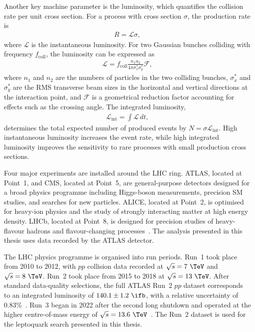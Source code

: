 Another key machine parameter is the luminosity, which quantifies the collision rate per unit cross section.
For a process with cross section $\sigma$, the production rate is
\begin{align}
    R = \mathcal{L}\sigma,
    \label{eq:lhc_event_rate}
\end{align}
where $\mathcal{L}$ is the instantaneous luminosity.
For two Gaussian bunches colliding with frequency $f_{\mathrm{coll}}$, the luminosity can be expressed as~\cite{Herr2006Luminosity}
\begin{align}
    \mathcal{L}
    =
    f_{\mathrm{coll}}
    \frac{n_{1}n_{2}}
    {4\pi\sigma^{*}_{x}\sigma^{*}_{y}}
    \mathcal{F},
    \label{eq:lhc_luminosity_formula}
\end{align}
where $n_{1}$ and $n_{2}$ are the numbers of particles in the two colliding bunches, $\sigma^{*}_{x}$ and $\sigma^{*}_{y}$ are the RMS transverse beam sizes in the horizontal and vertical directions at the interaction point, and $\mathcal{F}$ is a geometrical reduction factor accounting for effects such as the crossing angle.
The integrated luminosity,
\begin{align}
    \mathcal{L}_{\mathrm{int}}
    =
    \int \mathcal{L}\,dt,
    \label{eq:lhc_integrated_luminosity}
\end{align}
determines the total expected number of produced events by $N=\sigma\mathcal{L}_{\mathrm{int}}$.
High instantaneous luminosity increases the event rate, while high integrated luminosity improves the sensitivity to rare processes with small production cross sections.

Four major experiments are installed around the LHC ring.
ATLAS, located at Point~1, and CMS, located at Point~5, are general-purpose detectors designed for a broad physics programme including Higgs-boson measurements, precision SM studies, and searches for new particles.
ALICE, located at Point~2, is optimised for heavy-ion physics and the study of strongly interacting matter at high energy density.
LHCb, located at Point~8, is designed for precision studies of heavy-flavour hadrons and flavour-changing processes~\cite{Evans2008LHC}.
The analysis presented in this thesis uses data recorded by the ATLAS detector.

The LHC physics programme is organised into run periods.
Run~1 took place from 2010 to 2012, with $pp$ collision data recorded at $\sqrt{s}=7~\TeV$ and $\sqrt{s}=8~\TeV$.
Run~2 took place from 2015 to 2018 at $\sqrt{s}=13~\TeV$.
After standard data-quality selections, the full ATLAS Run~2 $pp$ dataset corresponds to an integrated luminosity of $140.1\pm1.2~\ifb$, with a relative uncertainty of $0.83\%$~\cite{ATLASLumiRun2}.
Run~3 began in 2022 after the second long shutdown and operated at the higher centre-of-mass energy of $\sqrt{s}=13.6~\TeV$~\cite{ATLASRun3Starts}.
The Run~2 dataset is used for the leptoquark search presented in this thesis.

